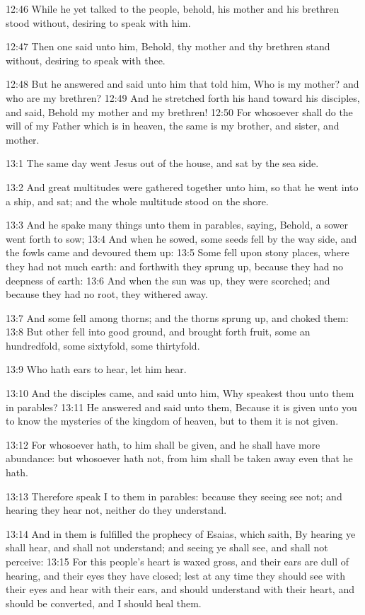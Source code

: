 12:46 While he yet talked to the people, behold, his mother and his
brethren stood without, desiring to speak with him.

12:47 Then one said unto him, Behold, thy mother and thy brethren
stand without, desiring to speak with thee.

12:48 But he answered and said unto him that told him, Who is my
mother?  and who are my brethren?  12:49 And he stretched forth his
hand toward his disciples, and said, Behold my mother and my brethren!
12:50 For whosoever shall do the will of my Father which is in heaven,
the same is my brother, and sister, and mother.

13:1 The same day went Jesus out of the house, and sat by the sea
side.

13:2 And great multitudes were gathered together unto him, so that he
went into a ship, and sat; and the whole multitude stood on the shore.

13:3 And he spake many things unto them in parables, saying, Behold, a
sower went forth to sow; 13:4 And when he sowed, some seeds fell by
the way side, and the fowls came and devoured them up: 13:5 Some fell
upon stony places, where they had not much earth: and forthwith they
sprung up, because they had no deepness of earth: 13:6 And when the
sun was up, they were scorched; and because they had no root, they
withered away.

13:7 And some fell among thorns; and the thorns sprung up, and choked
them: 13:8 But other fell into good ground, and brought forth fruit,
some an hundredfold, some sixtyfold, some thirtyfold.

13:9 Who hath ears to hear, let him hear.

13:10 And the disciples came, and said unto him, Why speakest thou
unto them in parables?  13:11 He answered and said unto them, Because
it is given unto you to know the mysteries of the kingdom of heaven,
but to them it is not given.

13:12 For whosoever hath, to him shall be given, and he shall have
more abundance: but whosoever hath not, from him shall be taken away
even that he hath.

13:13 Therefore speak I to them in parables: because they seeing see
not; and hearing they hear not, neither do they understand.

13:14 And in them is fulfilled the prophecy of Esaias, which saith, By
hearing ye shall hear, and shall not understand; and seeing ye shall
see, and shall not perceive: 13:15 For this people's heart is waxed
gross, and their ears are dull of hearing, and their eyes they have
closed; lest at any time they should see with their eyes and hear with
their ears, and should understand with their heart, and should be
converted, and I should heal them.

